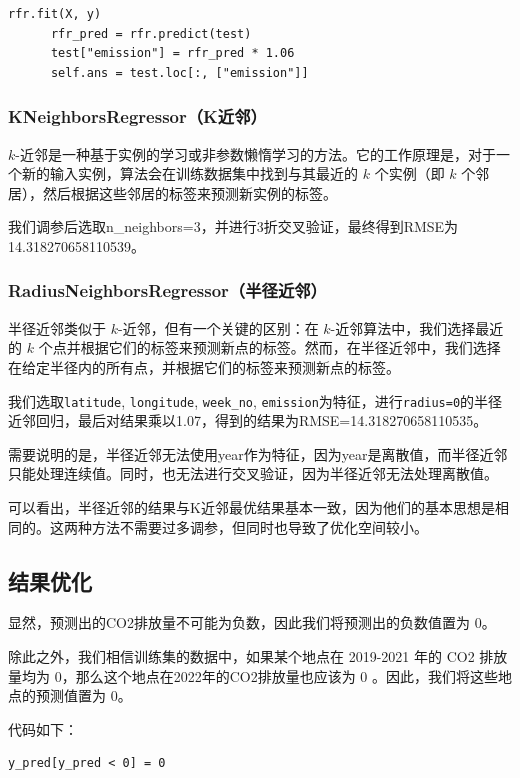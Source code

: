 \documentclass{ctexart}
\begin{document}
\begin{sloppypar}
\begin{lstlisting}[style=Python]
      rfr.fit(X, y)
      rfr_pred = rfr.predict(test)
      test["emission"] = rfr_pred * 1.06
      self.ans = test.loc[:, ["emission"]]
\end{lstlisting}

\subsubsection{KNeighborsRegressor（K近邻）}

$k$-近邻是一种基于实例的学习或非参数懒惰学习的方法。它的工作原理是，对于一个新的输入实例，算法会在训练数据集中找到与其最近的 $k$ 个实例（即 $k$ 个邻居），然后根据这些邻居的标签来预测新实例的标签。

我们调参后选取n\_neighbors=3，并进行3折交叉验证，最终得到RMSE为14.318270658110539。

\subsubsection{RadiusNeighborsRegressor（半径近邻）}

半径近邻类似于 $k$-近邻，但有一个关键的区别：在 $k$-近邻算法中，我们选择最近的 $k$ 个点并根据它们的标签来预测新点的标签。然而，在半径近邻中，我们选择在给定半径内的所有点，并根据它们的标签来预测新点的标签。

我们选取\texttt{latitude}, \texttt{longitude}, \texttt{week\_no}, \texttt{emission}为特征，进行\texttt{radius=0}的半径近邻回归，最后对结果乘以1.07，得到的结果为RMSE=14.318270658110535。

需要说明的是，半径近邻无法使用year作为特征，因为year是离散值，而半径近邻只能处理连续值。同时，也无法进行交叉验证，因为半径近邻无法处理离散值。

可以看出，半径近邻的结果与K近邻最优结果基本一致，因为他们的基本思想是相同的。这两种方法不需要过多调参，但同时也导致了优化空间较小。

\subsection{结果优化}

显然，预测出的CO2排放量不可能为负数，因此我们将预测出的负数值置为 0。

除此之外，我们相信训练集的数据中，如果某个地点在 2019-2021 年的 CO2 排放量均为 0，那么这个地点在2022年的CO2排放量也应该为 0 。因此，我们将这些地点的预测值置为 0。

代码如下：

\begin{lstlisting}[style=Python]
      y_pred[y_pred < 0] = 0
      

\end{lstlisting}
\end{sloppypar}
\end{document}
